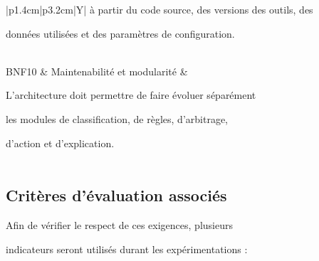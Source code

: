 \begin{table}[H]
\begin{tabularx}{\textwidth}{|p{1.4cm}|p{3.2cm}|Y|}
à partir du code source, des versions des outils, des

données utilisées et des paramètres de configuration. \\\\

\hline



BNF10 & Maintenabilité et modularité &

L'architecture doit permettre de faire évoluer séparément

les modules de classification, de règles, d'arbitrage,

d'action et d'explication. \\\\

\hline



\end{tabularx}

\end{table}



\subsection{Critères d'évaluation associés}



Afin de vérifier le respect de ces exigences, plusieurs

indicateurs seront utilisés durant les expérimentations :



